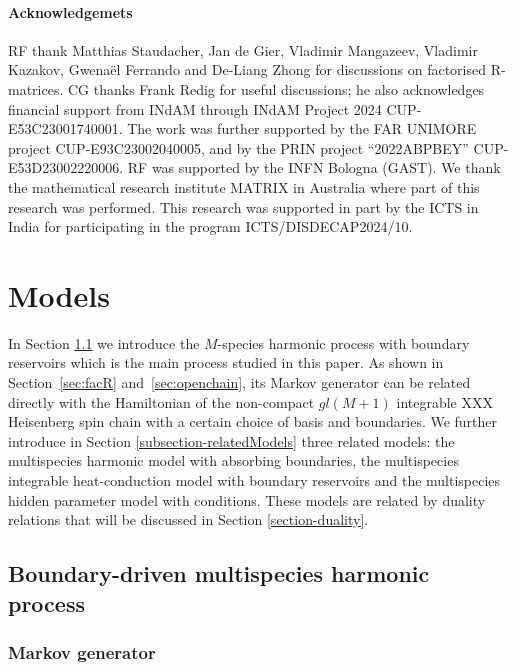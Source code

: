 \documentclass[11pt]{article}
\numberwithin{equation}{section}
\begin{document}
\paragraph{Acknowledgemets}
RF thank Matthias Staudacher, Jan de Gier, Vladimir Mangazeev, Vladimir Kazakov, Gwena\"{e}l Ferrando and De-Liang Zhong for discussions on factorised R-matrices.
CG thanks Frank Redig for  useful discussions; he also acknowledges financial support from INdAM through INdAM Project 2024 CUP-E53C23001740001.
The work was further  supported by the FAR
UNIMORE project CUP-E93C23002040005, and by the PRIN project “2022ABPBEY” CUP-E53D23002220006. RF was supported by the INFN Bologna (GAST). We thank the mathematical research institute MATRIX in Australia where part of this research was performed. This research was supported in part by the ICTS in India for participating in the program ICTS/DISDECAP2024/10.

\newpage
  
\section{Models}\label{sec:model}

In  Section \ref{sub-harmonic} we introduce the $M$-species harmonic process with boundary reservoirs which is the main process studied in this paper. As shown in Section~\ref{sec:facR} and~\ref{sec:openchain}, its Markov generator can be related directly with the Hamiltonian of the non-compact $gl(M+1)$ integrable XXX Heisenberg spin chain with a certain choice of basis and boundaries.  We further introduce in Section \ref{subsection-relatedModels} three related models:
the multispecies harmonic model with absorbing boundaries, the multispecies integrable heat-conduction model with boundary reservoirs and the multispecies hidden parameter model with conditions. These models are related by duality relations that will be discussed in Section \ref{section-duality}.

\subsection{Boundary-driven multispecies harmonic process}
\label{sub-harmonic}

 \subsubsection{Markov generator}\label{sec:markov}
\end{document}
